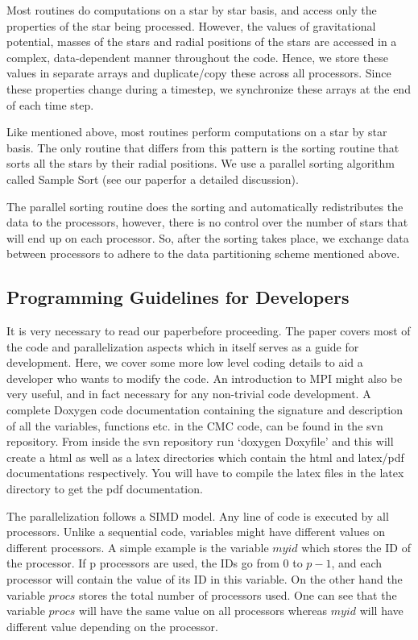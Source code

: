 \documentclass[11pt]{article}
\begin{document}
Most routines do computations on a star by star basis, and access only the properties of the star being processed. However, the values of gravitational potential, masses of the stars and radial positions of the stars are accessed in a complex, data-dependent manner throughout the code. Hence, we store these values in separate arrays and duplicate/copy these across all processors. Since these properties change during a timestep, we synchronize these arrays at the end of each time step.

Like mentioned above, most routines perform computations on a star by star basis. The only routine that differs from this pattern is the sorting routine that sorts all the stars by their radial positions. We use a parallel sorting algorithm called Sample Sort (see our paper\footnotemark[\value{footnote}] for a detailed discussion).

The parallel sorting routine does the sorting and automatically redistributes the data to the processors, however, there is no control over the number of stars that will end up on each processor. So, after the sorting takes place, we exchange data between processors to adhere to the data partitioning scheme mentioned above.

\subsection{Programming Guidelines for Developers}
It is very necessary to read our paper\footnotemark[\value{footnote}] before proceeding. The paper covers most of the code and parallelization aspects which in itself serves as a guide for development. Here, we cover some more low level coding details to aid a developer who wants to modify the code. An introduction to MPI might also be very useful, and in fact necessary for any non-trivial code development. A complete Doxygen code documentation containing the signature and description of all the variables, functions etc. in the CMC code, can be found in the svn repository. From inside the svn repository run `doxygen Doxyfile' and this will create a html as well as a latex directories which contain the html and latex/pdf documentations respectively. You will have to compile the latex files in the latex directory to get the pdf documentation.

The parallelization follows a SIMD model. Any line of code is executed by all processors. Unlike a sequential code, variables might have different values on different processors. A simple example is the variable $myid$ which stores the ID of the processor. If p processors are used, the IDs go from $0$ to $p-1$, and each processor will contain the value of its ID in this variable. On the other hand the variable $procs$ stores the total number of processors used. One can see that the variable $procs$ will have the same value on all processors whereas $myid$ will have different value depending on the processor.
\end{document}
